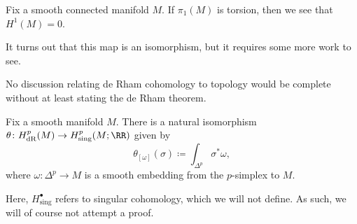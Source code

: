 \documentclass[../notes.tex]{subfiles}
\begin{document}
\begin{example}
	Fix a smooth connected manifold $M$. If $\pi_1(M)$ is torsion, then we see that $H^1(M)=0$.
\end{example}
\begin{remark}
	It turns out that this map is an isomorphism, but it requires some more work to see.
\end{remark}
No discussion relating de Rham cohomology to topology would be complete without at least stating the de Rham theorem.
\begin{theorem}[de Rham]
	Fix a smooth manifold $M$. There is a natural isomorphism $\theta\colon H^p_{\mathrm{dR}}(M)\to H^p_{\mathrm{sing}}(M;\RR)$ given by
	\[\theta_{[\omega]}(\sigma)\coloneqq\int_{\Delta^p}\sigma^*\omega,\]
	where $\omega\colon\Delta^p\to M$ is a smooth embedding from the $p$-simplex to $M$.
\end{theorem}
Here, $H^\bullet_{\mathrm{sing}}$ refers to singular cohomology, which we will not define. As such, we will of course not attempt a proof.
\end{document}
